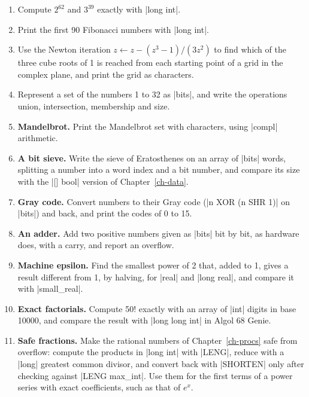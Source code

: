 \begin{enumerate}
\item Compute $2^{62}$ and $3^{39}$ exactly with \code|long int|.
\item Print the first 90 Fibonacci numbers with \code|long int|.
\item Use the Newton iteration $z \leftarrow z - (z^3 - 1) / (3z^2)$
  to find which of the three cube roots of 1 is reached from each
  starting point of a grid in the complex plane, and print the grid as
  characters.
\item Represent a set of the numbers 1 to 32 as \code|bits|, and write the
  operations union, intersection, membership and size.
\item \textbf{Mandelbrot.} Print the Mandelbrot set with characters,
  using \code|compl| arithmetic.
\item \textbf{A bit sieve.} Write the sieve of Eratosthenes on an array
  of \code|bits| words, splitting a number into a word index and a bit
  number, and compare its size with the \code|[] bool| version of
  Chapter~\ref{ch-data}.
\item \textbf{Gray code.} Convert numbers to their Gray code
  (\code|n XOR (n SHR 1)| on \code|bits|) and back, and print the codes
  of 0 to 15.
\item \textbf{An adder.} Add two positive numbers given as \code|bits|
  bit by bit, as hardware does, with a carry, and report an overflow.
\item \textbf{Machine epsilon.} Find the smallest power of 2 that,
  added to 1, gives a result different from 1, by halving, for
  \code|real| and \code|long real|, and compare it with \code|small_real|.
\item \textbf{Exact factorials.} Compute 50! exactly with an array of
  \code|int| digits in base 10000, and compare the result with
  \code|long long int| in Algol 68 Genie.
\item \textbf{Safe fractions.} Make the rational numbers of
  Chapter~\ref{ch-procs} safe from overflow: compute the products in
  \code|long int| with \code|LENG|, reduce with a \code|long| greatest
  common divisor, and convert back with \code|SHORTEN| only after
  checking against \code|LENG max_int|. Use them for the first terms of a
  power series with exact coefficients, such as that of $e^x$.
\end{enumerate}
